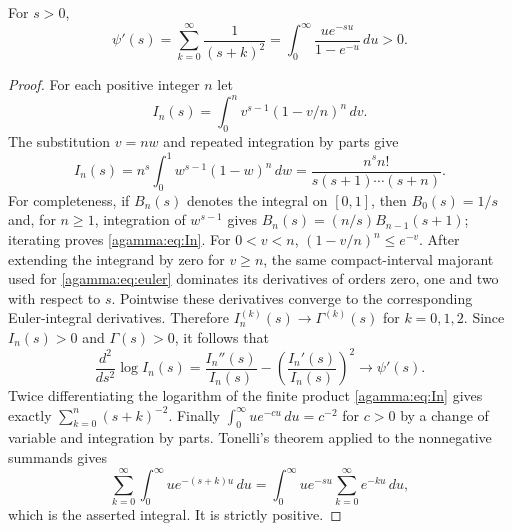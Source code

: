 \documentclass[11pt]{article}
\begin{document}
\begin{agammalemma}\label{agamma:lem:trigamma}
For $s>0$,
\begin{equation}\label{agamma:eq:trigamma}
\psi'(s)=\sum_{k=0}^\infty\frac1{(s+k)^2}
=\int_0^\infty\frac{u e^{-su}}{1-e^{-u}}\,du>0.
\end{equation}
\end{agammalemma}
\begin{proof}
For each positive integer $n$ let
\[
I_n(s)=\int_0^n v^{s-1}(1-v/n)^n\,dv.
\]
The substitution $v=nw$ and repeated integration by parts give
\begin{equation}\label{agamma:eq:In}
I_n(s)=n^s\int_0^1 w^{s-1}(1-w)^n\,dw
=\frac{n^s n!}{s(s+1)\cdots(s+n)}.
\end{equation}
For completeness, if $B_n(s)$ denotes the integral on $[0,1]$, then
$B_0(s)=1/s$ and, for $n\ge1$, integration of $w^{s-1}$ gives
$B_n(s)=(n/s)B_{n-1}(s+1)$; iterating proves \eqref{agamma:eq:In}.
For $0<v<n$, $(1-v/n)^n\le e^{-v}$. After extending the integrand
by zero for $v\ge n$, the same compact-interval majorant used for
\eqref{agamma:eq:euler} dominates its derivatives of orders zero, one and two
with respect to $s$. Pointwise these derivatives converge to the
corresponding Euler-integral derivatives. Therefore
$I_n^{(k)}(s)\to\Gamma^{(k)}(s)$ for $k=0,1,2$.
Since $I_n(s)>0$ and $\Gamma(s)>0$, it follows that
\[
\frac{d^2}{ds^2}\log I_n(s)
=\frac{I_n''(s)}{I_n(s)}-
\left(\frac{I_n'(s)}{I_n(s)}\right)^2
\longrightarrow\psi'(s).
\]
Twice differentiating the logarithm of the finite product
\eqref{agamma:eq:In} gives exactly $\sum_{k=0}^n(s+k)^{-2}$.
Finally $\int_0^\infty u e^{-cu}\,du=c^{-2}$ for $c>0$ by a change
of variable and integration by parts. Tonelli's theorem applied to
the nonnegative summands gives
\[
\sum_{k=0}^\infty\int_0^\infty u e^{-(s+k)u}\,du
=\int_0^\infty u e^{-su}\sum_{k=0}^\infty e^{-ku}\,du,
\]
which is the asserted integral. It is strictly positive.
\end{proof}
\end{document}
